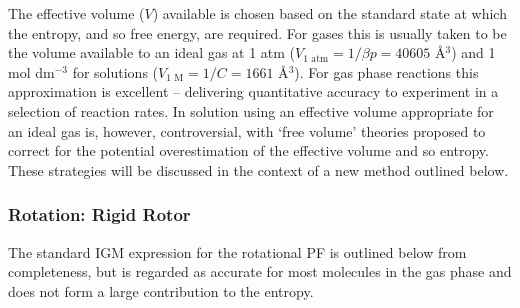 \documentclass[../main.tex]{subfiles}
\begin{document}
%

The effective volume ($V$) available is chosen based on the standard state at which the entropy, and so free energy, are required.\cite{Zhou2009} For gases this is usually taken to be the volume available to an ideal gas at 1 atm ($V_\text{1 atm} = 1 / \beta p= 40605$ \AA${}^3$) and 1 mol dm${}^{-3}$ for solutions ($V_\text{1 M} = 1/ C =  1661$ \AA${}^3$). For gas phase reactions this approximation is excellent -- delivering quantitative accuracy to experiment in a selection of reaction rates.\cite{Shan2019} In solution using an effective volume appropriate for an ideal gas is, however, controversial, with `free volume' theories proposed to correct for the potential overestimation of the effective volume and so entropy.\cite{Amzel1997} These strategies will be discussed in the context of a new method outlined below.

\subsubsection{Rotation: Rigid Rotor}

The standard IGM expression for the rotational PF is outlined below from completeness, but is regarded as accurate for most molecules in the gas phase and does not form a large contribution to the entropy.



\end{document}
